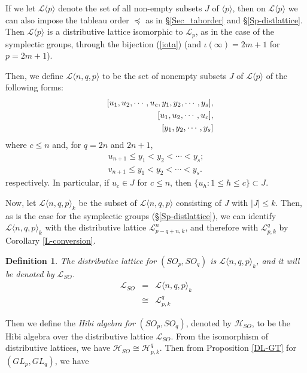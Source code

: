 \documentclass[11pt]{amsart}
\numberwithin{equation}{subsection}
\newtheorem{definition}[theorem]{Definition}
\begin{document}
If we let $\mathcal{L} \langle p \rangle$ denote the set of all non-empty subsets $J$
of $\langle p \rangle$, then on $\mathcal{L} \langle p \rangle$ we can also impose the tableau 
order $\preceq$ as in \S \ref{Sec_taborder} and \S \ref{Sp-distlattice}. Then $\mathcal{L}\langle p \rangle$ is a distributive
lattice isomorphic to $\mathcal{L}_{p}$, as in the case of the symplectic groups, through
the bijection (\ref{iota}) (and $\iota(\infty)=2m+1$ for $p=2m+1$).

\smallskip

Then, we define $\mathcal{L}\langle n, q, p \rangle$ to be the set of nonempty 
subsets $J$ of $\mathcal{L}\langle p \rangle$ of the following forms:
\begin{eqnarray}\label{SO-columns}
&&[u_1, u_2, \cdots , u_c , y_{1},y_{2},\cdots ,y_{s}], \\
&&[u_1, u_2, \cdots , u_c], \notag \\
&&[y_{1}, y_{2}, \cdots , y_{s}] \notag
\end{eqnarray}
where $c \leq n$ and, for $q=2n$ and $2n+1$, 
\begin{eqnarray*}
u_{n+1} \leq y_1 < y_2 < \cdots < y_s; \\
v_{n+1} \leq y_1 < y_2 < \cdots < y_s.
\end{eqnarray*}
respectively. In particular, if $u_c \in J$ for 
$c\leq n$, then $\{ u_h: 1 \leq h \leq c\} \subset J$.

\smallskip

Now, let $\mathcal{L}\langle n,q,  p \rangle_k$ be the subset of 
$\mathcal{L}\langle n, q, p \rangle$ consisting of $J$ with $|J| \leq k$. Then, as 
is the case for the symplectic groups (\S \ref{Sp-distlattice}), we can identify 
$\mathcal{L}\langle n, q, p \rangle_k$ 
with the distributive lattice $\mathcal{L}_{p-q+n, k}^n$, and therefore with $\mathcal{L}_{p,k}^q$
by Corollary \ref{L-conversion}.

\begin{definition}
The distributive lattice for $({SO}_{p},{SO}_{q})$ is $\mathcal{L}\langle n, q, p \rangle_k$, 
and it will be denoted by $\mathcal{L}_{SO}$.
\begin{eqnarray*}
\mathcal{L}_{SO} &=& \mathcal{L}\langle n, q, p \rangle_k \\
                 &\cong&  \mathcal{L}_{p, k}^q
\end{eqnarray*}
\end{definition}

Then we define the \textit{Hibi algebra for} $({SO}_{p},{SO}_{q})$, denoted 
by $\mathcal{H}_{SO}$, to be the Hibi algebra over the distributive lattice 
$\mathcal{L}_{SO}$. From the isomorphism of distributive lattices, we have 
$\mathcal{H}_{SO} \cong \mathcal{H}_{p, k}^q$. Then from 
Proposition \ref{DL-GT} for $(GL_{p}, GL_{q})$, we have
\end{document}
